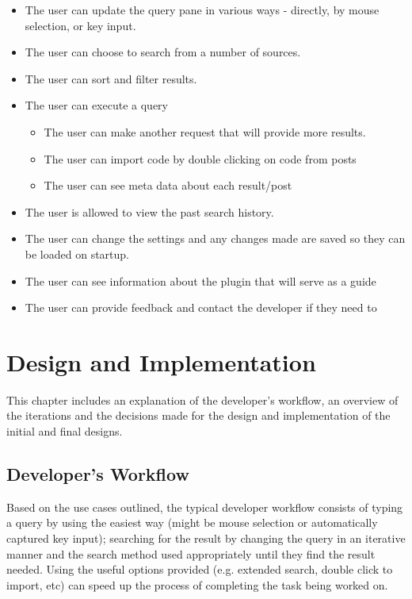 \documentclass{l4proj}
\begin{document}
\begin{itemize}
\item The user can update the query pane in various ways - directly, by mouse selection, or key input.
\item The user can choose to search from a number of sources.
\item The user can sort and filter results.

\item The user can execute a query
\begin{itemize}
\item The user can make another request that will provide more results.
\item The user can import code by double clicking on code from posts
\item The user can see meta data about each result/post
\end{itemize}

\item The user is allowed to view the past search history. 
\item The user can change the settings and any changes made are saved so they can be loaded on startup.
\item The user can see information about the plugin that will serve as a guide
\item The user can provide feedback and contact the developer if they need to
\end{itemize}

\chapter{Design and Implementation}

This chapter includes an explanation of the developer's workflow, an overview of the iterations and the decisions made for the design and implementation of the initial and final designs.

\section{Developer's Workflow}
Based on the use cases outlined, the typical developer workflow consists of typing a query by using the easiest way (might be mouse selection or automatically captured key input); searching for the result by changing the query in an iterative manner and the search method used appropriately until they find the result needed. Using the useful options provided (e.g. extended search, double click to import, etc) can speed up the process of completing the task being worked on.
\end{document}
